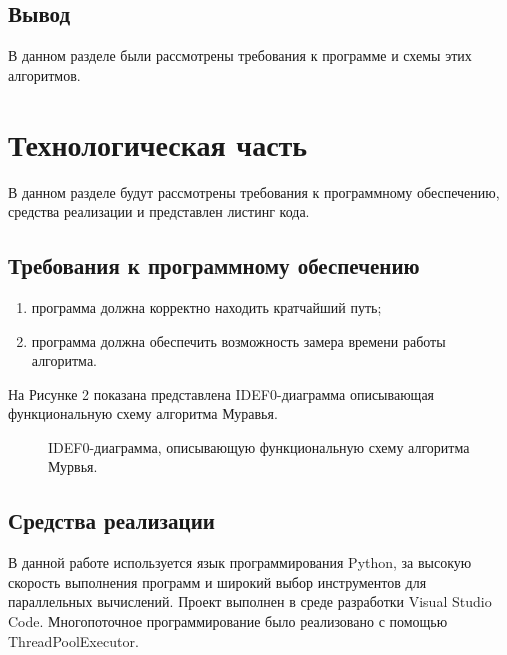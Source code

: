 \documentclass[a4paper, 12pt]{article}
\begin{document}
	\subsection{Вывод}
	\hspace*{5mm} В данном разделе были рассмотрены требования к программе и схемы этих алгоритмов. 


\newpage
\section{Технологическая часть}

	\hspace*{5mm} В данном разделе будут рассмотрены требования к программному обеспечению, средства реализации и представлен листинг кода.
	\subsection{Требования к программному обеспечению}
		\begin{enumerate}
		\item программа должна корректно находить кратчайший путь;
		\item программа должна обеспечить возможность замера времени работы алгоритма. 
	\end{enumerate}
	На Рисунке 2 показана представлена IDEF0-диаграмма описывающая функциональную схему алгоритма Муравья.
	\begin{figure}[h]
		\caption{IDEF0-диаграмма, описывающую функциональную схему алгоритма Мурвья.}
		\label{fig:ant}
	\end{figure}
	\subsection{Средства реализации}
	\hspace*{5mm} В данной работе используется язык программирования Python, за высокую скорость выполнения программ и широкий выбор инструментов для параллельных вычислений. Проект выполнен в среде разработки Visual Studio Code. Многопоточное программирование было реализовано с помощью ThreadPoolExecutor. \cite{doc}
	\clearpage
	\newpage 
\end{document}
